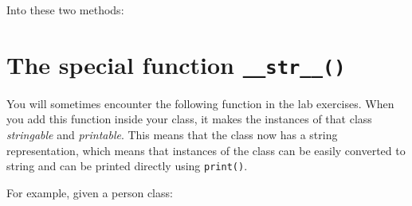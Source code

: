 Into these two methods:

\begin{Shaded}
\begin{Highlighting}[]
\NormalTok{):}
    \OperatorTok{=} \NormalTok{.\_\_list[}\NormalTok{::]}
\end{Highlighting}
\end{Shaded}

\begin{Shaded}
\begin{Highlighting}[]
\NormalTok{) }\OperatorTok{{-}\textgreater{}} \NormalTok{:}
     \NormalTok{.\_\_list[}\NormalTok{]}
\end{Highlighting}
\end{Shaded}

\section{\texorpdfstring{The special function
\texttt{\_\_str\_\_()}}{The special function \_\_str\_\_()}}\label{extra-stuff.md__the-special-function-__str__}

You will sometimes encounter the following function in the lab
exercises. When you add this function inside your class, it makes the
instances of that class \emph{stringable} and \emph{printable}. This
means that the class now has a string representation, which means that
instances of the class can be easily converted to string and can be
printed directly using \texttt{print()}.

For example, given a person class:

\begin{Shaded}
\begin{Highlighting}[]
     \NormalTok{(}\NormalTok{):}
        \OperatorTok{=}
        \OperatorTok{=}

     \NormalTok{(}\NormalTok{) }\OperatorTok{{-}\textgreater{}} \NormalTok{:}
         \OperatorTok{+}  \OperatorTok{+} \NormalTok{(}
\end{Highlighting}
\end{Shaded}


